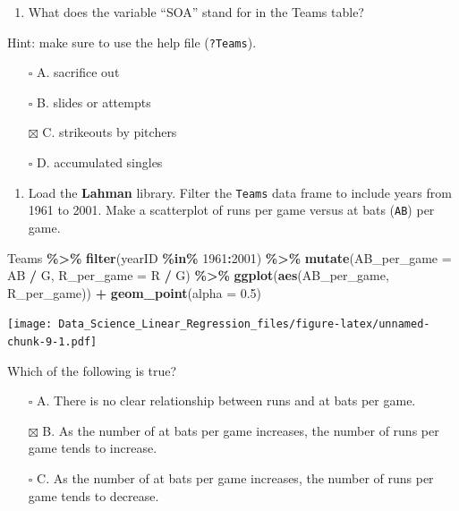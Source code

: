 \documentclass[
]{article}
\newenvironment{Shaded}{\begin{snugshade}}{\end{snugshade}}
\newcommand{\DataTypeTok}[1]{\textcolor[rgb]{0.13,0.29,0.53}{#1}}
\newcommand{\DecValTok}[1]{\textcolor[rgb]{0.00,0.00,0.81}{#1}}
\newcommand{\FloatTok}[1]{\textcolor[rgb]{0.00,0.00,0.81}{#1}}
\newcommand{\KeywordTok}[1]{\textcolor[rgb]{0.13,0.29,0.53}{\textbf{#1}}}
\newcommand{\NormalTok}[1]{#1}
\newcommand{\OperatorTok}[1]{\textcolor[rgb]{0.81,0.36,0.00}{\textbf{#1}}}
\newcommand{\StringTok}[1]{\textcolor[rgb]{0.31,0.60,0.02}{#1}}
\providecommand{\tightlist}{%
  \setlength{\itemsep}{0pt}\setlength{\parskip}{0pt}}
\begin{document}
\begin{enumerate}
\def\labelenumi{\arabic{enumi}.}
\setcounter{enumi}{4}
\tightlist
\item
  What does the variable ``SOA'' stand for in the Teams table?
\end{enumerate}

Hint: make sure to use the help file (\texttt{?Teams}).

\begin{itemize}
\tightlist
\item[$\square$]
  A. sacrifice out
\item[$\square$]
  B. slides or attempts
\item[$\boxtimes$]
  C. strikeouts by pitchers
\item[$\square$]
  D. accumulated singles
\end{itemize}

\begin{enumerate}
\def\labelenumi{\arabic{enumi}.}
\setcounter{enumi}{5}
\tightlist
\item
  Load the \textbf{Lahman} library. Filter the \texttt{Teams} data frame
  to include years from 1961 to 2001. Make a scatterplot of runs per
  game versus at bats (\texttt{AB}) per game.
\end{enumerate}

\begin{Shaded}
\begin{Highlighting}[]
\NormalTok{Teams }\OperatorTok{\%\textgreater{}\%}\StringTok{ }\KeywordTok{filter}\NormalTok{(yearID }\OperatorTok{\%in\%}\StringTok{ }\DecValTok{1961}\OperatorTok{:}\DecValTok{2001}\NormalTok{) }\OperatorTok{\%\textgreater{}\%}
\StringTok{  }\KeywordTok{mutate}\NormalTok{(}\DataTypeTok{AB\_per\_game =}\NormalTok{ AB }\OperatorTok{/}\StringTok{ }\NormalTok{G, }\DataTypeTok{R\_per\_game =}\NormalTok{ R }\OperatorTok{/}\StringTok{ }\NormalTok{G) }\OperatorTok{\%\textgreater{}\%}
\StringTok{  }\KeywordTok{ggplot}\NormalTok{(}\KeywordTok{aes}\NormalTok{(AB\_per\_game, R\_per\_game)) }\OperatorTok{+}\StringTok{ }
\StringTok{  }\KeywordTok{geom\_point}\NormalTok{(}\DataTypeTok{alpha =} \FloatTok{0.5}\NormalTok{)}
\end{Highlighting}
\end{Shaded}

\texttt{[image: Data\_Science\_Linear\_Regression\_files/figure-latex/unnamed-chunk-9-1.pdf]}

Which of the following is true?

\begin{itemize}
\tightlist
\item[$\square$]
  A. There is no clear relationship between runs and at bats per game.
\item[$\boxtimes$]
  B. As the number of at bats per game increases, the number of runs per
  game tends to increase.
\item[$\square$]
  C. As the number of at bats per game increases, the number of runs per
  game tends to decrease.
\end{itemize}
\end{document}
